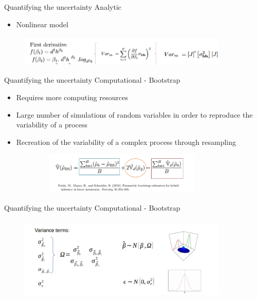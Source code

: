 \documentclass{beamer}
\begin{document}
\begin{frame}{Quantifying the uncertainty}
Analytic
\begin{itemize}
    \item Nonlinear model
\end{itemize}

\begin{figure}
        \centering
        \includegraphics[width = 10cm, height = 1.5cm]{pic/Imagem3.jpg}
        \end{figure}  
    
\end{frame}

\begin{frame}{Quantifying the uncertainty}
Computational - Bootstrap
\begin{itemize}
    \item Requires more computing resources
    \item Large number of simulations of random variables in order to reproduce the variability of a process
    \item Recreation of the variability of a complex process through resampling 
\end{itemize}

\begin{figure}
        \centering
        \includegraphics[width = 10cm, height = 2cm]{pic/bootstrap.jpg}
        \end{figure}      
\end{frame}

\begin{frame}{Quantifying the uncertainty}
Computational - Bootstrap
\begin{figure}
        \centering
        \includegraphics[width = 10cm, height = 4cm]{pic/bootstrap1.jpg}
        \end{figure}      
\end{frame}
\end{document}
